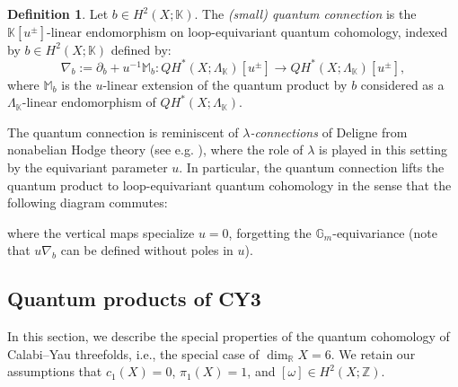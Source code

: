 \documentclass[reqno]{amsart}
\numberwithin{equation}{section}
\numberwithin{equation}{section}
\numberwithin{equation}{section}
\theoremstyle{definition}
\newtheorem{defn}[thm]{Definition}
\theoremstyle{remark}
\theoremstyle{remark}
\begin{document}
\begin{defn}
Let $b \in H^2(X;\mathbb{K})$. The \emph{(small) quantum connection} is the $\mathbb{K}[u^\pm]$-linear endomorphism on loop-equivariant quantum cohomology, indexed by $ b \in H^2(X;\mathbb{K})$ defined by:  
\begin{equation}
\nabla_b := \partial_b + u^{-1} \mathbb{M}_b : QH^*(X;\Lambda_{\mathbb{K}})[u^\pm] \to QH^*(X;\Lambda_{\mathbb{K}})[u^\pm],
\end{equation}
where $\mathbb{M}_b$ is the $u$-linear extension of the quantum product by $b$ considered as a $\Lambda_{\mathbb{K}}$-linear endomorphism of $QH^*(X;\Lambda_{\mathbb{K}})$.
\end{defn}


The quantum connection is reminiscent of \emph{$\lambda$-connections} of Deligne from nonabelian Hodge theory (see e.g. \cite{simpson-hodge-nonabelian}), where the role of $\lambda$ is played in this setting by the equivariant parameter $u$. In particular, the quantum connection lifts the quantum product to loop-equivariant quantum cohomology in the sense that the following diagram commutes:
\begin{center}
\end{center}
where the vertical maps specialize $u=0$, forgetting the $\mathbb{G}_m$-equivariance (note that $u\nabla_b$ can be defined without poles in $u$).


\subsection{Quantum products of CY3}\label{ssec:qhCY3}
In this section, we describe the special properties of the quantum cohomology of Calabi--Yau threefolds, i.e., the special case of $\dim_{\mathbb{R}} X = 6$. We retain our assumptions that $c_1(X) = 0$, $\pi_1(X) = 1$, and $[\omega] \in H^2(X;\mathbb{Z})$. 
\end{document}
